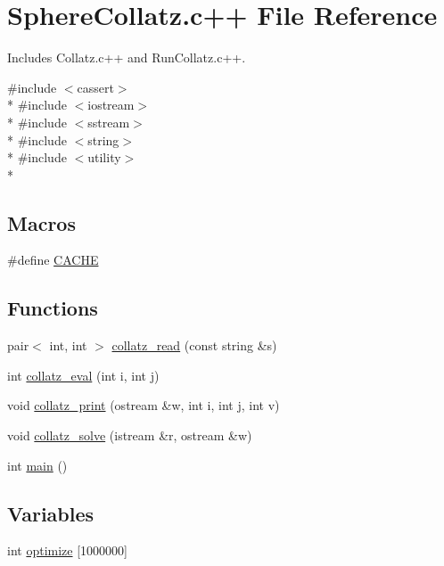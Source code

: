 \hypertarget{SphereCollatz_8c_09_09}{\section{Sphere\-Collatz.\-c++ File Reference}
\label{SphereCollatz_8c_09_09}
}


Includes Collatz.\-c++ and Run\-Collatz.\-c++.  


{\ttfamily \#include $<$cassert$>$}\\*
{\ttfamily \#include $<$iostream$>$}\\*
{\ttfamily \#include $<$sstream$>$}\\*
{\ttfamily \#include $<$string$>$}\\*
{\ttfamily \#include $<$utility$>$}\\*
\subsection*{Macros}
\begin{DoxyCompactItemize}
\item 
\#define \hyperlink{SphereCollatz_8c_09_09_a43fd55aa78bd891ebbd6a450f5eecce4}{C\-A\-C\-H\-E}
\end{DoxyCompactItemize}
\subsection*{Functions}
\begin{DoxyCompactItemize}
\item 
pair$<$ int, int $>$ \hyperlink{SphereCollatz_8c_09_09_a2772f8a734aeab48332eb3b282f991ba}{collatz\-\_\-read} (const string \&s)
\item 
int \hyperlink{SphereCollatz_8c_09_09_a0b0d3827a619c18aa4d96b8ee8b1c47d}{collatz\-\_\-eval} (int i, int j)
\item 
void \hyperlink{SphereCollatz_8c_09_09_aeda0b7ea3e40e1e7487ccc436f33a559}{collatz\-\_\-print} (ostream \&w, int i, int j, int v)
\item 
void \hyperlink{SphereCollatz_8c_09_09_a0ac646d2122741f9a9a52201bf9551cc}{collatz\-\_\-solve} (istream \&r, ostream \&w)
\item 
int \hyperlink{SphereCollatz_8c_09_09_ae66f6b31b5ad750f1fe042a706a4e3d4}{main} ()
\end{DoxyCompactItemize}
\subsection*{Variables}
\begin{DoxyCompactItemize}
\item 
int \hyperlink{SphereCollatz_8c_09_09_a1ef8937739e2b89b534c4ab7469e0629}{optimize} \mbox{[}1000000\mbox{]}
\end{DoxyCompactItemize}


